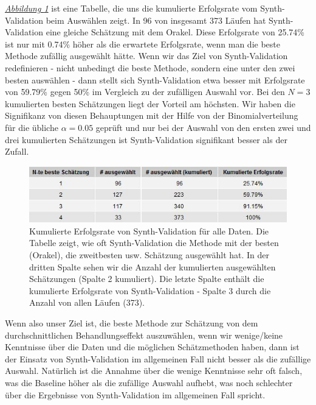 \documentclass[12pt,a4paper,twoside]{scrartcl}
\numberwithin{equation}{section}
\newcommand{\reffig}[1]{\emph{\hyperref[#1]{Abbildung \ref*{#1}}}}
\begin{document}
\noindent
\reffig{fig:allRunsGrid} ist eine Tabelle, die uns die kumulierte Erfolgsrate vom Synth-Validation beim Auswählen zeigt. In 96 von insgesamt 373 Läufen hat Synth-Validation eine gleiche Schätzung mit dem Orakel. Diese Erfolgsrate von 25.74\% ist nur mit 0.74\% höher als die erwartete Erfolgsrate, wenn man die beste Methode zufällig ausgewählt hätte. Wenn wir das Ziel von Synth-Validation redefinieren - nicht unbedingt die beste Methode, sondern eine unter den zwei besten auswählen - dann stellt sich Synth-Validation etwa besser mit Erfolgsrate von 59.79\% gegen 50\% im Vergleich zu der zufälligen Auswahl vor. Bei den $N=3$ kumulierten besten Schätzungen liegt der Vorteil am höchsten. Wir haben die Signifikanz von diesen Behauptungen mit der Hilfe von der Binomialverteilung für die übliche $\alpha = 0.05$ geprüft und nur bei der Auswahl von den ersten zwei und drei kumulierten Schätzungen ist Synth-Validation signifikant besser als der Zufall. \par

\begin{center}
\begin{figure}[h]
    \centering
    \includegraphics[height=0.2\textwidth, width=1\textwidth]{figures/plots/allRunsGrid.jpeg}
    \caption[Kumulierte Erfolgsrate von Synth-Validation für alle Daten]{Kumulierte Erfolgsrate von Synth-Validation für alle Daten. Die Tabelle zeigt, wie oft Synth-Validation die Methode mit der besten (Orakel), die zweitbesten usw. Schätzung ausgewählt hat. In der dritten Spalte sehen wir die Anzahl der kumulierten ausgewählten Schätzungen (Spalte 2 kumuliert). Die letzte Spalte enthält die kumulierte Erfolgsrate von Synth-Validation - Spalte 3 durch die Anzahl von allen Läufen (373).}\label{fig:allRunsGrid}
  \end{figure}
\end{center}

\noindent
Wenn also unser Ziel ist, die beste Methode zur Schätzung von dem durchschnittlichen Behandlungseffekt auszuwählen, wenn wir wenige/keine Kenntnisse über die Daten und die möglichen Schätzmethoden haben, dann ist der Einsatz von Synth-Validation im allgemeinen Fall nicht besser als die zufällige Auswahl. Natürlich ist die Annahme über die wenige Kenntnisse sehr oft falsch, was die Baseline höher als die zufällige Auswahl aufhebt, was noch schlechter über die Ergebnisse von Synth-Validation im allgemeinen Fall spricht.\par
\end{document}

